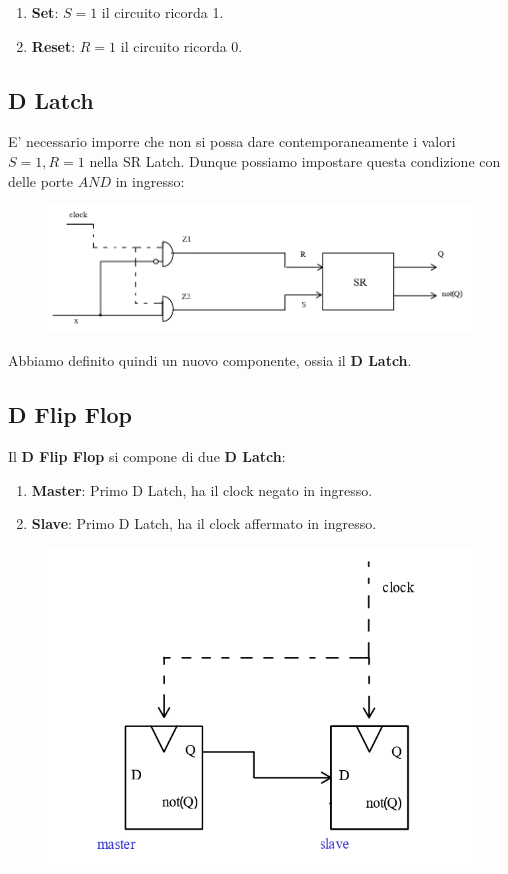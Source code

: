 \documentclass{article}
\begin{document}
\begin{enumerate}
    \item \textbf{Set}: $S=1$ il circuito ricorda 1.
    \item \textbf{Reset}: $R=1$ il circuito ricorda 0.
\end{enumerate}

\newpage

\subsection{D Latch} E' necessario imporre che non si possa dare contemporaneamente i valori $S=1, R=1$ nella SR Latch. Dunque possiamo impostare questa condizione con delle porte $AND$ in ingresso:

\begin{figure}[htbp]
    \includegraphics[scale=0.4]{img/memorie3.png}
    \centering
\end{figure}

Abbiamo definito quindi un nuovo componente, ossia il \textbf{D Latch}.

\subsection{D Flip Flop}

Il \textbf{D Flip Flop} si compone di due \textbf{D Latch}:
\begin{enumerate}
    \item \textbf{Master}: Primo D Latch, ha il clock negato in ingresso.
    \item \textbf{Slave}: Primo D Latch, ha il clock affermato in ingresso.
\end{enumerate}

\begin{figure}[htbp]
    \includegraphics[scale=0.35]{img/D_flip_flop.png}
    \centering
\end{figure}
\end{document}
